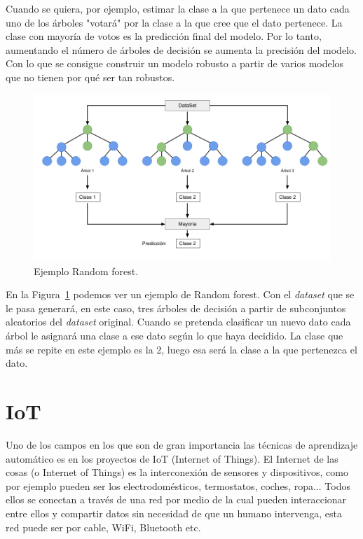 \documentclass[a4paper, 12pt]{book}
\begin{document}
Cuando se quiera, por ejemplo, estimar la clase a la que pertenece un dato cada uno de los árboles "votará" por la clase a la que cree que el dato pertenece. La clase con mayoría de votos es la predicción final del modelo. Por lo tanto, aumentando el número de árboles de decisión se aumenta la precisión del modelo. Con lo que se consigue construir un modelo robusto a partir de varios modelos que no tienen por qué ser tan robustos.

\begin{figure}[]
  \centering
  \includegraphics[width=14cm, keepaspectratio]{img/ejemplo_randomForest.png}
  \caption{Ejemplo Random forest.}\label{fig:ejemplo_rforest}
\end{figure}

En la Figura~\ref{fig:ejemplo_rforest} podemos ver un ejemplo de Random forest. Con el \textit{dataset} que se le pasa generará, en este caso, tres árboles de decisión a partir de subconjuntos aleatorios del \textit{dataset} original. Cuando se pretenda clasificar un nuevo dato cada árbol le asignará una clase a ese dato según lo que haya decidido. La clase que más se repite en este ejemplo es la 2, luego esa será la clase a la que pertenezca el dato.

\section{IoT}
\label{sec:IoT}

Uno de los campos en los que son de gran importancia las técnicas de aprendizaje automático es en los proyectos de IoT (Internet of Things). El Internet de las cosas (o Internet of Things) es la interconexión de sensores y dispositivos, como por ejemplo pueden ser los electrodomésticos, termostatos, coches, ropa... Todos ellos se conectan a través de una red por medio de la cual pueden interaccionar entre ellos y compartir datos sin necesidad de que un humano intervenga, esta red puede ser por cable, WiFi, Bluetooth etc. 
\end{document}
